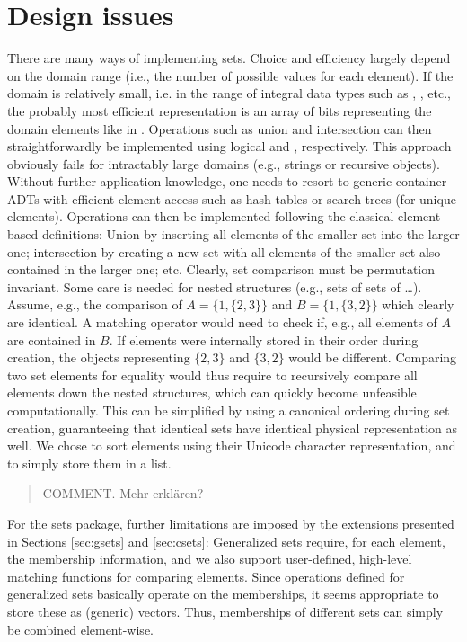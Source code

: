 \documentclass[article]{jss}
\newcommand{\comment}[1]{\begin{quote} COMMENT. #1\end{quote}}
\begin{document}
\section{Design issues}
\label{sec:design}

There are many ways of implementing sets. Choice and efficiency largely
depend on the domain range (i.e., the number of possible values for each
element). If the domain is relatively small, i.e. in the range of integral
data types such as , ,  etc., the
probably most efficient representation is an array of bits
representing the domain elements like in 
\citep{sets:wirth:1983}.
Operations such as union and
intersection can then straightforwardly be implemented
using logical  and , respectively.
This approach obviously fails for intractably large domains
(e.g., strings or recursive objects). Without
further application knowledge, one needs to resort to generic
container ADTs with efficient element access such as hash tables or
search trees (for unique elements).
Operations can then be implemented following the classical
element-based definitions: Union by
inserting all elements of the smaller set into the
larger one; intersection by creating a new set with
all elements of the smaller set also contained in the larger one;
etc. Clearly, set comparison must be permutation invariant.
Some care is needed for nested structures (e.g., sets of sets of
\dots). Assume, e.g., the comparison of
$A = \{1, \{2, 3\}\}$ and $B = \{1, \{3, 2\}\}$ which clearly are identical.
A matching operator would need to check if, e.g., all elements of $A$ are
contained in $B$. If elements were internally stored in their order during
creation, the objects representing
$\{2, 3\}$ and $\{3, 2\}$ would be different. Comparing two set elements
for equality would thus require to recursively compare all elements
down the nested structures, which can quickly become unfeasible computationally.
This can be simplified by using a
canonical ordering during set creation,
guaranteeing that identical sets have identical
physical representation as well. We chose to sort
elements using their Unicode character representation, and to simply
store them in a list.
\comment{Mehr erkl{\"a}ren?}
For the sets package, further limitations are imposed by the
extensions presented in Sections \ref{sec:gsets} and
\ref{sec:csets}: Generalized sets require, for each element,
the membership information, and we also support user-defined, high-level
matching functions for comparing elements. Since operations defined
for generalized sets basically operate on the memberships,
it seems appropriate to store these as (generic) vectors.
Thus, memberships of
different sets can simply be combined element-wise.
\end{document}
